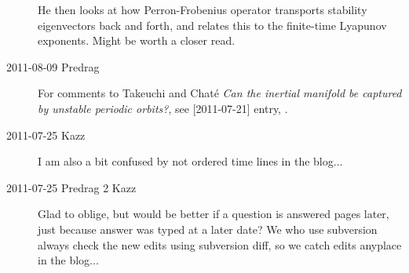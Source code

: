 \begin{description}
He then looks at how Perron-Frobenius operator transports
stability eigenvectors back and forth, and relates this to
the finite-time Lyapunov exponents. Might be worth a closer read.

\item[2011-08-09 Predrag] For comments to Takeuchi and Chat\'e
\emph{Can the inertial manifold be captured by unstable periodic
orbits?}, see [2011-07-21] entry, .

\item[2011-07-25 Kazz]
I am also a bit confused by not ordered time lines in the blog...

\item[2011-07-25 Predrag 2 Kazz]
Glad to oblige, but would be better if a question is answered pages
later, just because answer was typed at a later date? We who use subversion
always check the new edits using subversion diff, so we catch
edits anyplace in the blog...

\end{description}

\renewcommand{\ssp}{a}
